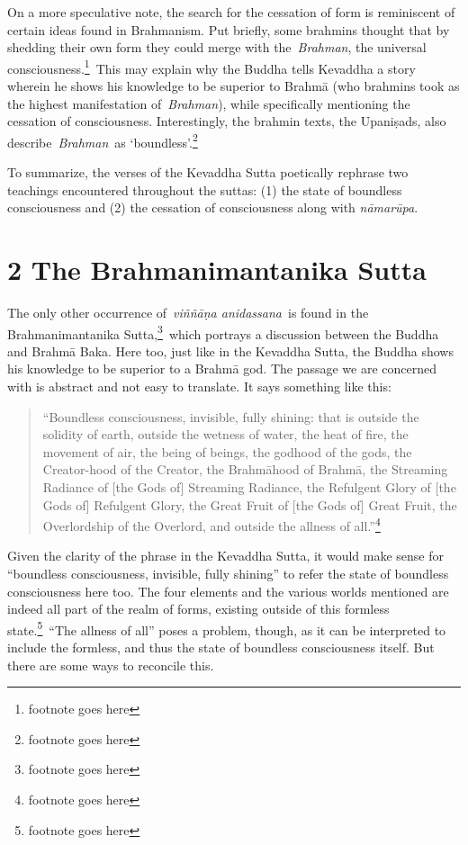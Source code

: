 \documentclass[10pt, openany]{book}
\begin{document}
On a more speculative note, the search for the cessation of form is reminiscent of certain ideas found in Brahmanism. Put briefly, some brahmins thought that by shedding their own form they could merge with the \textit{Brahman}, the universal consciousness.\footnote{footnote goes here} This may explain why the Buddha tells Kevaddha a story wherein he shows his knowledge to be superior to Brahmā (who brahmins took as the highest manifestation of \textit{Brahman}), while specifically mentioning the cessation of consciousness. Interestingly, the brahmin texts, the Upaniṣads, also describe \textit{Brahman} as ‘boundless’.\footnote{footnote goes here}


To summarize, the verses of the Kevaddha Sutta poetically rephrase two teachings encountered throughout the suttas: (1) the state of boundless consciousness and (2) the cessation of consciousness along with \textit{nāmarūpa}.


\chapter{ 2 The Brahmanimantanika Sutta}
The only other occurrence of \textit{viññāṇa anidassana} is found in the Brahmanimantanika Sutta,\footnote{footnote goes here} which portrays a discussion between the Buddha and Brahmā Baka. Here too, just like in the Kevaddha Sutta, the Buddha shows his knowledge to be superior to a Brahmā god. The passage we are concerned with is abstract and not easy to translate. It says something like this:


\begin{quote}


“Boundless consciousness, invisible, fully shining: that is outside the solidity of earth, outside the wetness of water, the heat of fire, the movement of air, the being of beings, the godhood of the gods, the Creator-hood of the Creator, the Brahmāhood of Brahmā, the Streaming Radiance of [the Gods of] Streaming Radiance, the Refulgent Glory of [the Gods of] Refulgent Glory, the Great Fruit of [the Gods of] Great Fruit, the Overlordship of the Overlord, and outside the allness of all.”\footnote{footnote goes here}




\end{quote}
Given the clarity of the phrase in the Kevaddha Sutta, it would make sense for “boundless consciousness, invisible, fully shining” to refer the state of boundless consciousness here too. The four elements and the various worlds mentioned are indeed all part of the realm of forms, existing outside of this formless state.\footnote{footnote goes here} “The allness of all” poses a problem, though, as it can be interpreted to include the formless, and thus the state of boundless consciousness itself. But there are some ways to reconcile this.
\end{document}

